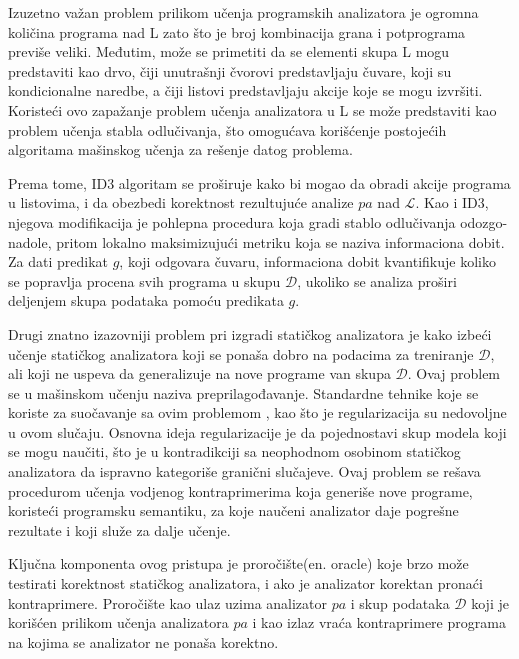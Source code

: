 \documentclass[a4paper]{article}
\theoremstyle{definition}
\begin{document}
{%
Izuzetno važan problem prilikom učenja programskih analizatora je ogromna količina 
programa nad L zato što je broj kombinacija grana i potprograma previše veliki. 
Međutim, može se primetiti da se elementi skupa L mogu predstaviti kao drvo, čiji 
unutrašnji čvorovi predstavljaju čuvare, koji su kondicionalne naredbe, a čiji 
listovi predstavljaju akcije koje se mogu izvršiti. Koristeći ovo zapažanje problem 
učenja analizatora u L se može predstaviti kao problem učenja stabla odlučivanja, 
što omogućava korišćenje postojećih algoritama mašinskog učenja za 
rešenje datog problema.

Prema tome, ID3 \cite{id3} algoritam se proširuje kako bi mogao da obradi akcije 
programa u listovima, i da obezbedi korektnost rezultujuće analize $pa$ nad 
$\mathcal{L}$. Kao i ID3, njegova modifikacija je pohlepna procedura koja gradi 
stablo odlučivanja odozgo-nadole, pritom lokalno maksimizujući metriku koja se 
naziva informaciona dobit. Za dati predikat $g$, koji odgovara čuvaru, 
informaciona dobit kvantifikuje koliko se popravlja procena svih programa u 
skupu $\mathcal{D}$, ukoliko se analiza proširi deljenjem skupa podataka 
pomoću predikata $g$.


Drugi znatno izazovniji problem pri izgradi statičkog analizatora je 
kako izbeći učenje statičkog analizatora koji se ponaša dobro 
na podacima za treniranje $\mathcal{D}$, ali koji ne uspeva da 
generalizuje na nove programe van skupa $\mathcal{D}$. Ovaj problem se u mašinskom 
učenju naziva preprilagođavanje. Standardne tehnike koje se koriste za suočavanje 
sa ovim problemom \cite{statisticalLearningTheory}, kao što je regularizacija su 
nedovoljne u ovom slučaju. Osnovna ideja regularizacije je da pojednostavi skup 
modela koji se mogu naučiti, što je u kontradikciji sa neophodnom osobinom 
statičkog analizatora da ispravno kategoriše granični slučajeve. Ovaj problem 
se rešava procedurom učenja vodjenog kontraprimerima koja generiše nove 
programe, koristeći programsku semantiku, za koje naučeni analizator daje 
pogrešne rezultate i koji služe za dalje učenje. 


Ključna komponenta ovog pristupa je proročište(en. oracle) koje brzo može 
testirati korektnost statičkog analizatora, i ako je analizator korektan 
pronaći kontraprimere. Proročište kao ulaz uzima analizator $pa$ i skup 
podataka $\mathcal{D}$ koji je korišćen prilikom učenja analizatora $pa$ 
i kao izlaz vraća kontraprimere programa na kojima se analizator ne 
ponaša korektno.

}
\end{document}
